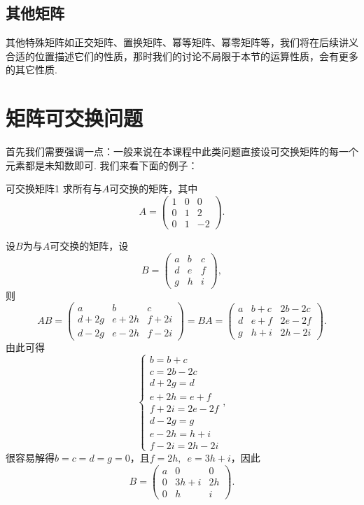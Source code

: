\subsection{其他矩阵}

其他特殊矩阵如正交矩阵、置换矩阵、幂等矩阵、幂零矩阵等，我们将在后续讲义合适的位置描述它们的性质，那时我们的讨论不局限于本节的运算性质，会有更多的其它性质.

\section{矩阵可交换问题}

首先我们需要强调一点：一般来说在本课程中此类问题直接设可交换矩阵的每一个元素都是未知数即可. 我们来看下面的例子：
\begin{example}{}{可交换矩阵1}
    求所有与$A$可交换的矩阵，其中
    \[A=\begin{pmatrix}
            1 & 0 & 0  \\
            0 & 1 & 2  \\
            0 & 1 & -2
        \end{pmatrix}.\]
\end{example}

\begin{solution}
    设$B$为与$A$可交换的矩阵，设
    \[B=\begin{pmatrix}
            a & b & c \\
            d & e & f \\
            g & h & i
        \end{pmatrix},\]
    则
    \[AB=\begin{pmatrix}
            a    & b    & c    \\
            d+2g & e+2h & f+2i \\
            d-2g & e-2h & f-2i
        \end{pmatrix}=BA=\begin{pmatrix}
            a & b+c & 2b-2c \\
            d & e+f & 2e-2f \\
            g & h+i & 2h-2i
        \end{pmatrix}.\]
    由此可得
    \[\begin{cases}
            b=b+c      \\
            c=2b-2c    \\
            d+2g=d     \\
            e+2h=e+f   \\
            f+2i=2e-2f \\
            d-2g=g     \\
            e-2h=h+i   \\
            f-2i=2h-2i
        \end{cases},\]
    很容易解得$b=c=d=g=0$，且$f=2h,\enspace e=3h+i$，因此
    \[B=\begin{pmatrix}
            a & 0    & 0  \\
            0 & 3h+i & 2h \\
            0 & h    & i
        \end{pmatrix}.\]
\end{solution}

